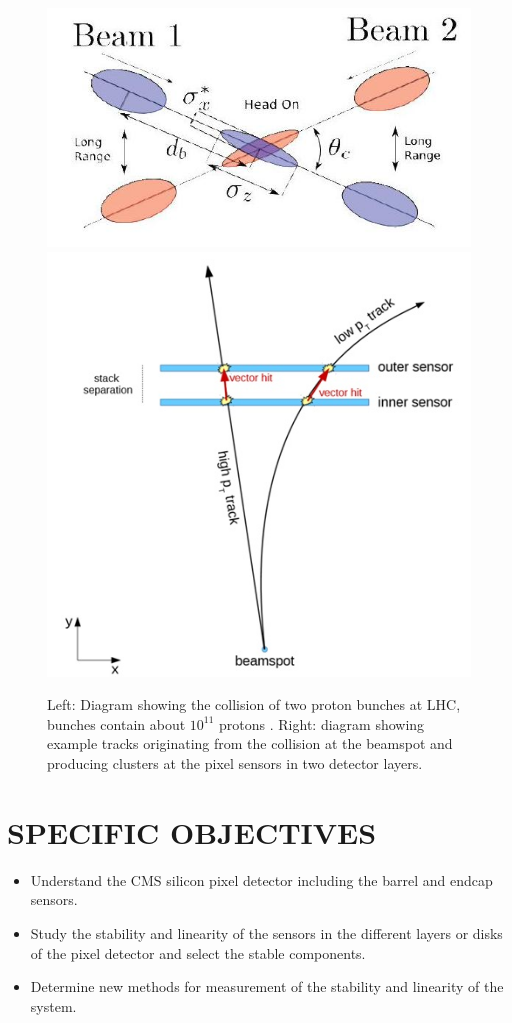 \documentclass[final,12pt]{article}
\begin{document}
\begin{figure}[H]
  \centering
  \includegraphics[width=0.5\columnwidth]{./bunchcrossing.jpg}
  \includegraphics[width=0.4\columnwidth]{./vectorhit1.jpg}
  \caption{
    Left: Diagram showing the collision of two proton bunches at LHC, bunches contain about $10^{11}$ protons  \cite{deMaria:2008zzb}.
    Right: diagram showing example tracks originating from the collision at the beamspot and producing clusters at the pixel sensors in two detector layers.
  }
  \label{fig:trackcluster}
\end{figure}


\section{SPECIFIC OBJECTIVES}

\begin{itemize}
  
\item Understand the CMS silicon pixel detector including the barrel and endcap sensors.
  
\item Study the stability and linearity of the sensors in the different layers or disks of the pixel detector and select the stable components.
  
\item Determine new methods for measurement of the stability and linearity of the system.
  
\end{itemize}
\end{document}
